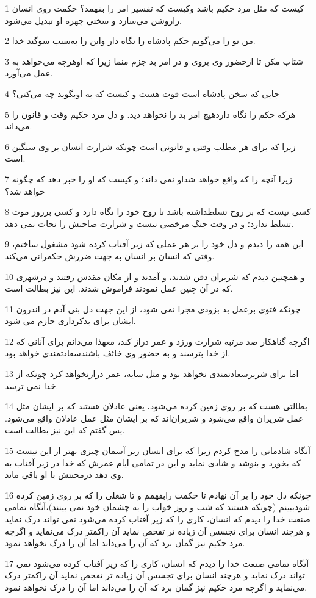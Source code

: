 \par 1 کیست که مثل مرد حکیم باشد وکیست که تفسیر امر را بفهمد؟ حکمت روی انسان راروشن می‌سازد و سختی چهره او تبدیل می‌شود.
\par 2 من تو را می‌گویم حکم پادشاه را نگاه دار واین را به‌سبب سوگند خدا.
\par 3 شتاب مکن تا ازحضور وی بروی و در امر بد جزم منما زیرا که اوهر‌چه می‌خواهد به عمل می‌آورد.
\par 4 جایی که سخن پادشاه است قوت هست و کیست که به اوبگوید چه می‌کنی؟
\par 5 هر‌که حکم را نگاه داردهیچ امر بد را نخواهد دید. و دل مرد حکیم وقت و قانون را می‌داند.
\par 6 زیرا که برای هر مطلب وقتی و قانونی است چونکه شرارت انسان بر وی سنگین است.
\par 7 زیرا آنچه را که واقع خواهد شداو نمی داند؛ و کیست که او را خبر دهد که چگونه خواهد شد؟
\par 8 کسی نیست که بر روح تسلطداشته باشد تا روح خود را نگاه دارد و کسی برروز موت تسلط ندارد؛ و در وقت جنگ مرخصی نیست و شرارت صاحبش را نجات نمی دهد.
\par 9 این همه را دیدم و دل خود را بر هر عملی که زیر آفتاب کرده شود مشغول ساختم، وقتی که انسان بر انسان به جهت ضررش حکمرانی می‌کند.
\par 10 و همچنین دیدم که شریران دفن شدند، و آمدند و از مکان مقدس رفتند و درشهری که در آن چنین عمل نمودند فراموش شدند. این نیز بطالت است.
\par 11 چونکه فتوی برعمل بد بزودی مجرا نمی شود، از این جهت دل بنی آدم در اندرون ایشان برای بدکرداری جازم می شود.
\par 12 اگر‌چه گناهکار صد مرتبه شرارت ورزد و عمر دراز کند، معهذا می‌دانم برای آنانی که از خدا بترسند و به حضور وی خائف باشندسعادتمندی خواهد بود.
\par 13 اما برای شریرسعادتمندی نخواهد بود و مثل سایه، عمر درازنخواهد کرد چونکه از خدا نمی ترسد.
\par 14 بطالتی هست که بر روی زمین کرده می‌شود، یعنی عادلان هستند که بر ایشان مثل عمل شریران واقع می‌شود و شریران‌اند که بر ایشان مثل عمل عادلان واقع می‌شود. پس گفتم که این نیز بطالت است.
\par 15 آنگاه شادمانی را مدح کردم زیرا که برای انسان زیر آسمان چیزی بهتر از این نیست که بخورد و بنوشد و شادی نماید و این در تمامی ایام عمرش که خدا در زیر آفتاب به وی دهد درمحنتش با او باقی ماند.
\par 16 چونکه دل خود را بر آن نهادم تا حکمت رابفهمم و تا شغلی را که بر روی زمین کرده شودببینم (چونکه هستند که شب و روز خواب را به چشمان خود نمی بینند)،آنگاه تمامی صنعت خدا را دیدم که انسان، کاری را که زیر آفتاب کرده می‌شود نمی تواند درک نماید و هر‌چند انسان برای تجسس آن زیاده تر تفحص نماید آن راکمتر درک می‌نماید و اگر‌چه مرد حکیم نیز گمان برد که آن را می‌داند اما آن را درک نخواهد نمود.
\par 17 آنگاه تمامی صنعت خدا را دیدم که انسان، کاری را که زیر آفتاب کرده می‌شود نمی تواند درک نماید و هر‌چند انسان برای تجسس آن زیاده تر تفحص نماید آن راکمتر درک می‌نماید و اگر‌چه مرد حکیم نیز گمان برد که آن را می‌داند اما آن را درک نخواهد نمود.
 
